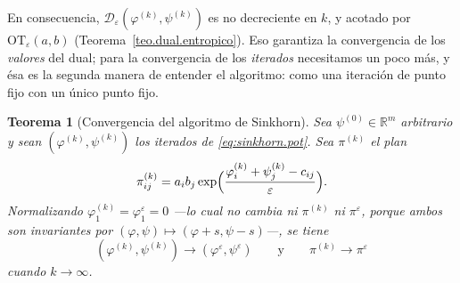 \documentclass[12pt, a4paper]{amsbook}
\newcommand{\R}{{\mathbb R}}
\newtheorem{teo}{Teorema}[section]
\theoremstyle{remark}
\theoremstyle{definition}
\numberwithin{section}{chapter}
\numberwithin{subsection}{section}
\numberwithin{equation}{section}
\numberwithin{figure}{chapter}
\begin{document}
En consecuencia, $\mathcal D_\varepsilon(\varphi^{(k)},\psi^{(k)})$ es no
decreciente en $k$, y acotado por $\mathrm{OT}_\varepsilon(a,b)$
(Teorema~\ref{teo.dual.entropico}). Eso garantiza la convergencia de los
\emph{valores} del dual; para la convergencia de los \emph{iterados}
necesitamos un poco más, y ésa es la segunda manera de entender el
algoritmo: como una iteración de punto fijo con un único punto fijo.

\begin{teo}[Convergencia del algoritmo de Sinkhorn]\label{teo.sinkhorn.convergencia}
Sea $\psi^{(0)}\in\R^m$ arbitrario y sean $(\varphi^{(k)},\psi^{(k)})$ los
iterados de \eqref{eq:sinkhorn.pot}. Sea $\pi^{(k)}$ el plan
\[
\pi^{(k)}_{ij}=a_ib_j\exp\Bigl(\frac{\varphi^{(k)}_i+\psi^{(k)}_j-c_{ij}}{\varepsilon}\Bigr).
\]
Normalizando $\varphi^{(k)}_1=\varphi^\varepsilon_1=0$ —lo cual no cambia ni
$\pi^{(k)}$ ni $\pi^\varepsilon$, porque ambos son invariantes por
$(\varphi,\psi)\mapsto(\varphi+s,\psi-s)$—, se tiene
\[
(\varphi^{(k)},\psi^{(k)})\longrightarrow(\varphi^\varepsilon,\psi^\varepsilon)
\qquad\text{y}\qquad
\pi^{(k)}\longrightarrow\pi^\varepsilon
\]
cuando $k\to\infty$.
\end{teo}
\end{document}
